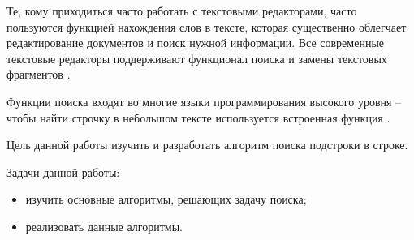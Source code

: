 \newpage
{}

Те, кому приходиться часто работать с текстовыми редакторами,
часто пользуются функцией нахождения слов в тексте,
которая существенно облегчает редактирование документов и
поиск нужной информации. Все современные текстовые редакторы
поддерживают функционал поиска и замены
текстовых фрагментов \cite{office}.

Функции поиска входят во многие языки
программирования высокого уровня – чтобы найти строчку
в небольшом тексте используется встроенная функция \cite{cpp}.

Цель данной работы изучить и разработать алгоритм поиска
подстроки в строке.

Задачи данной работы:

\begin{itemize}
    \item изучить основные алгоритмы, решающих задачу поиска;
    \item реализовать данные алгоритмы.
\end{itemize}
